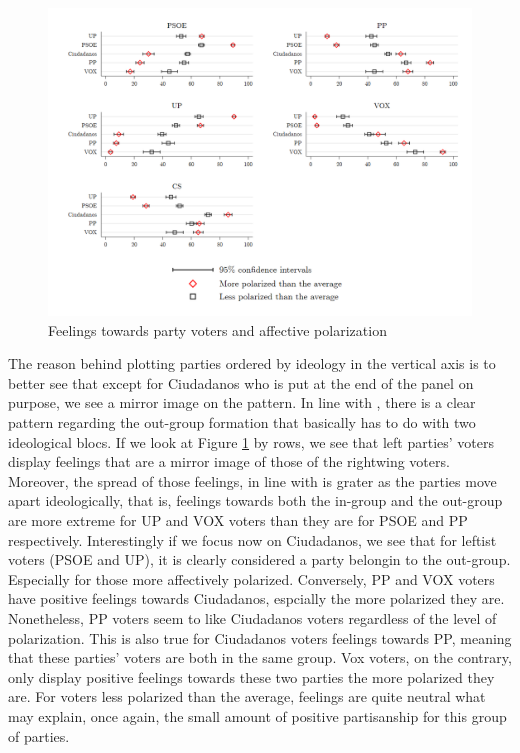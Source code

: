 \documentclass[a4paper, svgnames]{article}
\begin{document}
\begin{figure}[H]
	\centering
	\includegraphics[width=\textwidth]{Figures/combinedfeelingsAP.png}
	\caption{\label{fig:feelings} Feelings towards party voters and affective polarization}
\end{figure}

The reason behind plotting parties ordered by ideology in the vertical axis is to better see that except for Ciudadanos who is put at the end of the panel on purpose, we see a mirror image on the pattern. In line with \citep*{Orriols2020}, there is a clear pattern regarding the out-group formation that basically has to do with two ideological blocs. If we look at Figure \ref{fig:feelings} by rows, we see that left parties' voters display feelings that are a mirror image of those of the rightwing voters. Moreover, the spread of those feelings, in line with \citep*{Wagner2021} is grater as the parties move apart ideologically, that is, feelings towards both the in-group and the  out-group are more extreme for UP and VOX voters than they are for PSOE and PP respectively. Interestingly if we focus now on Ciudadanos, we see that for leftist voters (PSOE and UP), it is clearly considered a party belongin to the out-group. Especially for those more affectively polarized. Conversely, PP and VOX voters have positive feelings towards Ciudadanos, espcially the more polarized they are. Nonetheless, PP voters seem to like Ciudadanos voters regardless of the level of polarization. This is also true for Ciudadanos voters feelings towards PP, meaning that these parties' voters are both in the same group. Vox voters, on the contrary, only display positive feelings towards these two parties the more polarized they are. For voters less polarized than the average, feelings are quite neutral what may explain, once again, the small amount of positive partisanship for this group of parties.
\end{document}
